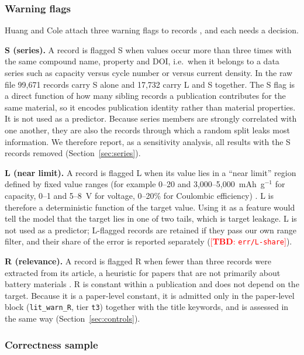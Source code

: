 \documentclass[journal=jcisd8,manuscript=article,layout=traditional]{achemso}
\newcommand{\TBD}[1]{\textcolor{red}{[\textbf{TBD}: \nolinkurl{#1}]}}
\begin{document}
\subsubsection{Warning flags}
\label{sec:warnings}

Huang and Cole attach three warning flags to records \cite{huang2020database}, and each needs a decision.

\textbf{S (series).} A record is flagged S when values occur more than three times with the same compound name, property and DOI, i.e.\ when it belongs to a data series such as capacity versus cycle number or versus current density. In the raw file 99,671 records carry S alone and 17,732 carry L and S together. The S flag is a direct function of how many sibling records a publication contributes for the same material, so it encodes publication identity rather than material properties. It is not used as a predictor. Because series members are strongly correlated with one another, they are also the records through which a random split leaks most information. We therefore report, as a sensitivity analysis, all results with the S records removed (Section~\ref{sec:series}).

\textbf{L (near limit).} A record is flagged L when its value lies in a ``near limit'' region defined by fixed value ranges (for example 0--20 and 3,000--5,000~mAh~g$^{-1}$ for capacity, 0--1 and 5--8~V for voltage, 0--20\% for Coulombic efficiency) \cite{huang2020database}. L is therefore a deterministic function of the target value. Using it as a feature would tell the model that the target lies in one of two tails, which is target leakage. L is not used as a predictor; L-flagged records are retained if they pass our own range filter, and their share of the error is reported separately (\TBD{err/L-share}).

\textbf{R (relevance).} A record is flagged R when fewer than three records were extracted from its article, a heuristic for papers that are not primarily about battery materials \cite{huang2020database}. R is constant within a publication and does not depend on the target. Because it is a paper-level constant, it is admitted only in the paper-level block (\texttt{lit\_warn\_R}, tier \texttt{t3}) together with the title keywords, and is assessed in the same way (Section~\ref{sec:controls}).

\subsubsection{Correctness sample}
\label{sec:quality}
\end{document}
